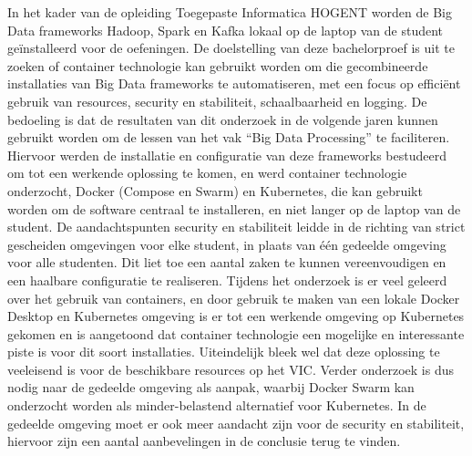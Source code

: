 In het kader van de opleiding Toegepaste Informatica HOGENT worden de Big Data frameworks Hadoop, Spark en Kafka lokaal op de laptop van de student geïnstalleerd voor de oefeningen.
De doelstelling van deze bachelorproef is uit te zoeken of container technologie kan gebruikt worden om die gecombineerde installaties van Big Data frameworks te automatiseren, met een focus op efficiënt gebruik van resources, security en stabiliteit, schaalbaarheid en logging. De bedoeling is dat de resultaten van dit onderzoek in de volgende jaren kunnen gebruikt worden om de lessen van het vak ``Big Data Processing'' te faciliteren.
\newline
Hiervoor werden de installatie en configuratie van deze frameworks bestudeerd om tot een werkende oplossing te komen, en werd container technologie onderzocht, Docker (Compose en Swarm) en Kubernetes, die kan gebruikt worden om de software centraal te installeren, en niet langer op de laptop van de student.
\newline
De aandachtspunten security en stabiliteit leidde in de richting van strict gescheiden omgevingen voor elke student, in plaats van \'e\'en gedeelde omgeving voor alle studenten. Dit liet toe een aantal zaken te kunnen vereenvoudigen en een haalbare configuratie te realiseren.
\newline
Tijdens het onderzoek is er veel geleerd over het gebruik van containers, en door gebruik te maken van een lokale Docker Desktop en Kubernetes omgeving is er tot een werkende omgeving op Kubernetes gekomen en is aangetoond dat container technologie een mogelijke en interessante piste is voor dit soort installaties.
\newline
Uiteindelijk bleek wel dat deze oplossing te veeleisend is voor de beschikbare resources op het VIC. Verder onderzoek is dus nodig naar de gedeelde omgeving als aanpak, waarbij Docker Swarm kan onderzocht worden als minder-belastend alternatief voor Kubernetes. In de gedeelde omgeving moet er ook meer aandacht zijn voor de security en stabiliteit, hiervoor zijn een aantal aanbevelingen in de conclusie terug te vinden.
\newline
\newline
